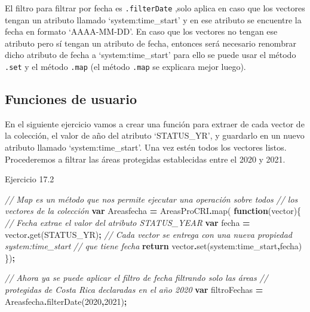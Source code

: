 \documentclass[
  12pt,
  letterpaper,
  twoside]{book}
\newenvironment{Shaded}{\begin{snugshade}}{\end{snugshade}}
\newcommand{\CommentTok}[1]{\textcolor[rgb]{0.56,0.35,0.01}{\textit{#1}}}
\newcommand{\ControlFlowTok}[1]{\textcolor[rgb]{0.13,0.29,0.53}{\textbf{#1}}}
\newcommand{\DecValTok}[1]{\textcolor[rgb]{0.00,0.00,0.81}{#1}}
\newcommand{\FunctionTok}[1]{\textcolor[rgb]{0.00,0.00,0.00}{#1}}
\newcommand{\KeywordTok}[1]{\textcolor[rgb]{0.13,0.29,0.53}{\textbf{#1}}}
\newcommand{\NormalTok}[1]{#1}
\newcommand{\OperatorTok}[1]{\textcolor[rgb]{0.81,0.36,0.00}{\textbf{#1}}}
\newcommand{\StringTok}[1]{\textcolor[rgb]{0.31,0.60,0.02}{#1}}
\begin{document}
El filtro para filtrar por fecha es \texttt{.filterDate} ,solo aplica en caso que los vectores tengan un atributo llamado `system:time\_start' y en ese atributo se encuentre la fecha en formato `AAAA-MM-DD'. En caso que los vectores no tengan ese atributo pero sí tengan un atributo de fecha, entonces será necesario renombrar dicho atributo de fecha a `system:time\_start' para ello se puede usar el método \texttt{.set} y el método \texttt{.map} (el método \texttt{.map} se explicara mejor luego).

\hypertarget{funciones-de-usuario}{%
\subsection{Funciones de usuario}\label{funciones-de-usuario}}

En el siguiente ejercicio vamos a crear una función para extraer de cada vector de la colección, el valor de año del atributo `STATUS\_YR', y guardarlo en un nuevo atributo llamado `system:time\_start'. Una vez estén todos los vectores listos. Procederemos a filtrar las áreas protegidas establecidas entre el 2020 y 2021.

Ejercicio 17.2

\begin{Shaded}
\begin{Highlighting}[]
\CommentTok{// Map es un método que nos permite ejecutar una operación sobre todos }
\CommentTok{// los vectores de la colección}
\KeywordTok{var}\NormalTok{ Areasfecha }\OperatorTok{=}\NormalTok{ AreasProCRI}\OperatorTok{.}\FunctionTok{map}\NormalTok{( }\KeywordTok{function}\NormalTok{(vector)\{ }
  \CommentTok{// Fecha extrae el valor del atributo \textquotesingle{}STATUS\_YEAR\textquotesingle{}}
  \KeywordTok{var}\NormalTok{ fecha }\OperatorTok{=}\NormalTok{ vector}\OperatorTok{.}\FunctionTok{get}\NormalTok{(}\StringTok{\textquotesingle{}STATUS\_YR\textquotesingle{}}\NormalTok{)}\OperatorTok{;}   
  \CommentTok{// Cada vector se entrega con una nueva propiedad \textquotesingle{}system:time\_start\textquotesingle{} }
  \CommentTok{// que tiene fecha}
  \ControlFlowTok{return}\NormalTok{ vector}\OperatorTok{.}\FunctionTok{set}\NormalTok{(}\StringTok{\textquotesingle{}system:time\_start\textquotesingle{}}\OperatorTok{,}\NormalTok{fecha)}
\NormalTok{\})}\OperatorTok{;} 

\CommentTok{// Ahora ya se puede aplicar el filtro de fecha filtrando solo las áreas }
\CommentTok{// protegidas de Costa Rica declaradas en el año 2020}
\KeywordTok{var}\NormalTok{ filtroFechas }\OperatorTok{=}\NormalTok{ Areasfecha}\OperatorTok{.}\FunctionTok{filterDate}\NormalTok{(}\DecValTok{2020}\OperatorTok{,}\DecValTok{2021}\NormalTok{)}\OperatorTok{;} 
\end{Highlighting}
\end{Shaded}
\end{document}
